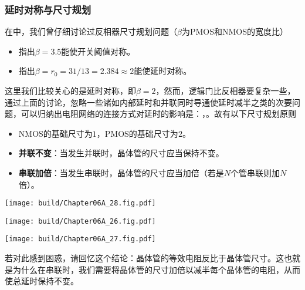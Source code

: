 \subsubsection{延时对称与尺寸规划}
在中，我们曾仔细讨论过反相器尺寸规划问题（$\beta$为PMOS和NMOS的宽度比）
\begin{itemize}
    \item {}指出$\beta=3.5$能使开关阈值对称。
    \item {}指出$\beta=r_0=31/13=2.384\approx 2$能使延时对称。
\end{itemize}
这里我们比较关心的是延时对称，即$\beta=2$，然而，逻辑门比反相器要复杂一些，通过上面的讨论，忽略一些诸如内部延时和并联同时导通使延时减半之类的次要问题，可以归纳出电阻网络的连接方式对延时的影响是：，。故有以下尺寸规划原则
\begin{itemize}
    \item NMOS的基础尺寸为$1$，PMOS的基础尺寸为$2$。
    \item \textbf{并联不变}：当发生并联时，晶体管的尺寸应当保持不变。
    \item \textbf{串联加倍}：当发生串联时，晶体管的尺寸应当加倍（若是$N$个管串联则加$N$倍）。
\end{itemize}
\begin{Figure}[互补CMOS逻辑门的尺寸规划]
    \begin{FigureSub}[非门;互补CMOS逻辑门的尺寸规划非门]
        \texttt{[image: build/Chapter06A\_28.fig.pdf]}
    \end{FigureSub}
    \hspace{0.25cm}
    \begin{FigureSub}
        \texttt{[image: build/Chapter06A\_26.fig.pdf]}
    \end{FigureSub}
    \hspace{0.25cm}
    \begin{FigureSub}
        \texttt{[image: build/Chapter06A\_27.fig.pdf]}
    \end{FigureSub}
\end{Figure}
若对此感到困惑，请回忆这个结论：晶体管的等效电阻反比于晶体管尺寸。这也就是为什么在串联时，我们需要将晶体管的尺寸加倍以减半每个晶体管的电阻，从而使总延时保持不变。

